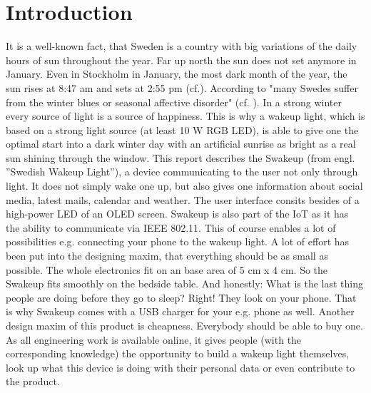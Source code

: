 \chapter{Introduction} 
\label{chap:introduction} 
It is a well-known fact, that Sweden is a country with big variations of the
daily hours of sun throughout the year. Far up north the sun does not set
anymore in January. Even in Stockholm in January, the most dark month of the
year, the sun rises at 8:47 am and sets at 2:55 pm
(cf.\cite{other:visitsweden}). According to  "many Swedes
suffer from the winter blues or seasonal affective disorder" (cf.
\cite{other:sverigesradio}). In a strong winter every source of light is a
source of happiness. This is why a wakeup light, which is based on a strong
light source (at least 10 W RGB LED), is able to give one the optimal start into
a dark winter day with an artificial sunrise as bright as a real sun shining
through the window.  
\newpar
This report describes the Swakeup (from engl. ”Swedish Wakeup Light”), a device
communicating to the user not only through light. It does not simply wake one
up, but also gives one information about social media, latest mails, calendar
and weather. The user interface consits besides of a high-power LED of an OLED
screen. Swakeup is also part of the IoT as it has the ability to communicate via
IEEE 802.11. This of course enables a lot of possibilities e.g. connecting your
phone to the wakeup light. A lot of effort has been put into the designing
maxim, that everything should be as small as possible. The whole electronics fit
on an base area of 5 cm x 4 cm. So the Swakeup fits smoothly on the bedside
table. And honestly: What is the last thing people are doing before they go to
sleep? Right! They look on your phone. That is why Swakeup comes with a USB
charger for your e.g. phone as well. Another design maxim of this product is
cheapness. Everybody should be able to buy one. As all engineering work is
available online, it gives people (with the corresponding knowledge) the
opportunity to build a wakeup light themselves, look up what this device is
doing with their personal data or even contribute to the product.
